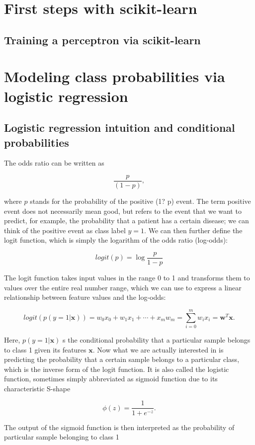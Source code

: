 \documentclass[letterpaper]{report}
\begin{document}
\section{First steps with scikit-learn}
\subsection{Training a perceptron via scikit-learn}
\section{Modeling class probabilities via logistic regression}
\subsection{Logistic regression intuition and conditional probabilities}

The odds ratio can be written as

\[
\frac{p}{(1-p)},
\]

where $p$ stands for the probability of the positive (1? p)
 event. The term positive event does not necessarily mean good, but refers to the event that we want to predict, for example, the probability that a patient has a certain disease; we can think of the positive event as class label $y =1$. We can then further define the logit function, which is simply the logarithm of the odds ratio (log-odds):

\[
logit(p) = \log \frac{p}{1-p}
\]

The logit function takes input values in the range 0 to 1 and transforms them to values over the entire real number range, which we can use to express a linear relationship between feature values and the log-odds:

\[
logit ( p (y=1 | \mathbf{x})) = w_0 x_0 + w_1 x_1 + \cdots + x_m w_m = \sum^{m}_{i=0} w_i x_i = \mathbf{w}^T \mathbf{x}.
\]

Here, $p(y=1 | \mathbf{x})$ s the conditional probability that a particular sample belongs to class 1 given its features $\mathbf{x}$. Now what we are actually interested in is predicting the probability that a certain sample belongs to a particular class, which is the inverse form of the logit function. It is also called the logistic function, sometimes simply abbreviated as sigmoid function due to its characteristic S-shape

\[
\phi(z) = \frac{1}{1+e^{-z}}.
\]

The output of the sigmoid function is then interpreted as the probability of particular sample belonging to class 1
\end{document}
